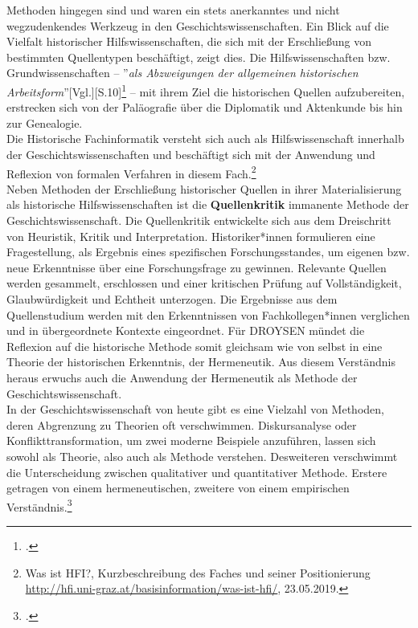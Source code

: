 \documentclass[12pt,a4paper]{article}
\begin{document}
Methoden hingegen sind und waren ein stets anerkanntes und nicht wegzudenkendes Werkzeug in den Geschichtswissenschaften. Ein Blick auf die Vielfalt historischer Hilfswissenschaften, die sich mit der Erschließung von bestimmten Quellentypen beschäftigt, zeigt dies. Die Hilfswissenschaften bzw. Grundwissenschaften -- ''\textit{als Abzweigungen der allgemeinen historischen Arbeitsform}''[Vgl.][S.10]\footcite{von2007werkzeug} -- mit ihrem Ziel die historischen Quellen aufzubereiten, erstrecken sich von der Paläografie über die Diplomatik und Aktenkunde bis hin zur Genealogie.
\\
Die Historische Fachinformatik versteht sich auch als Hilfswissenschaft innerhalb der Geschichtswissenschaften und beschäftigt sich mit der Anwendung und Reflexion von formalen Verfahren in diesem Fach.\footnote{Was ist HFI?, Kurzbeschreibung des Faches und seiner Positionierung \protect\url{http://hfi.uni-graz.at/basisinformation/was-ist-hfi/}, 23.05.2019.} 
\\
Neben Methoden der Erschließung historischer Quellen in ihrer Materialisierung als historische Hilfswissenschaften ist die \textbf{Quellenkritik} immanente Methode der Geschichtswissenschaft. Die Quellenkritik entwickelte sich aus dem Dreischritt von Heuristik, Kritik und Interpretation. Historiker*innen formulieren eine Fragestellung, als Ergebnis eines spezifischen Forschungsstandes, um eigenen bzw. neue  Erkenntnisse über eine Forschungsfrage zu gewinnen. Relevante Quellen werden gesammelt, erschlossen und einer kritischen Prüfung auf Vollständigkeit, Glaubwürdigkeit und Echtheit unterzogen. Die Ergebnisse aus dem Quellenstudium werden mit den Erkenntnissen von Fachkollegen*innen verglichen und in übergeordnete Kontexte eingeordnet. Für DROYSEN mündet die Reflexion auf die historische Methode somit gleichsam wie von selbst in eine Theorie der historischen Erkenntnis, der Hermeneutik. Aus diesem Verständnis heraus erwuchs auch die Anwendung der Hermeneutik als Methode der Geschichtswissenschaft.
\\
In der Geschichtswissenschaft von heute gibt es eine Vielzahl von Methoden, deren Abgrenzung zu Theorien oft verschwimmen. Diskursanalyse oder Konflikttransformation, um zwei moderne Beispiele anzuführen, lassen sich sowohl als Theorie, also auch als Methode verstehen. Desweiteren verschwimmt die Unterscheidung zwischen qualitativer und quantitativer Methode. Erstere getragen von einem hermeneutischen, zweitere von einem empirischen Verständnis.\footcite[][S.2-5]{sokollgrundlagen} 
\\
\end{document}
